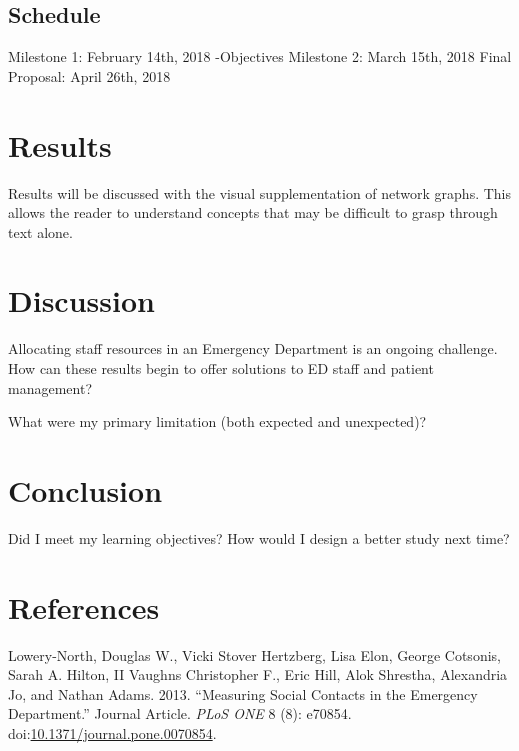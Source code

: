 \documentclass[]{elsarticle} %
\begin{document}
\subsection{Schedule}\label{schedule}

Milestone 1: February 14th, 2018 -Objectives Milestone 2: March 15th,
2018 Final Proposal: April 26th, 2018

\section{Results}\label{results}

Results will be discussed with the visual supplementation of network
graphs. This allows the reader to understand concepts that may be
difficult to grasp through text alone.

\section{Discussion}\label{discussion}

Allocating staff resources in an Emergency Department is an ongoing
challenge. How can these results begin to offer solutions to ED staff
and patient management?

What were my primary limitation (both expected and unexpected)?

\section{Conclusion}\label{conclusion}

Did I meet my learning objectives? How would I design a better study
next time?

\section*{References}\label{references.unnumbered}

\hypertarget{refs}{}
\hypertarget{ref-RN1}{}
Lowery-North, Douglas W., Vicki Stover Hertzberg, Lisa Elon, George
Cotsonis, Sarah A. Hilton, II Vaughns Christopher F., Eric Hill, Alok
Shrestha, Alexandria Jo, and Nathan Adams. 2013. ``Measuring Social
Contacts in the Emergency Department.'' Journal Article. \emph{PLoS ONE}
8 (8): e70854.
doi:\href{https://doi.org/10.1371/journal.pone.0070854}{10.1371/journal.pone.0070854}.
\end{document}
